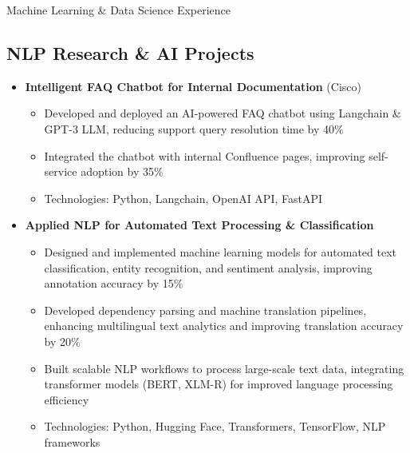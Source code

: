 \documentclass{resume} %
\begin{document}
\begin{rSection}{Machine Learning \& Data Science Experience}

    \subsection*{NLP Research \& AI Projects}
        \begin{itemize}
            \item \textbf{Intelligent FAQ Chatbot for Internal Documentation} (Cisco)
                \begin{itemize}
                    \item Developed and deployed an AI-powered FAQ chatbot using Langchain \& GPT-3 LLM, reducing support query resolution time by 40\%
                    \item Integrated the chatbot with internal Confluence pages, improving self-service adoption by 35\%
                    \item Technologies: Python, Langchain, OpenAI API, FastAPI
                \end{itemize}
            \item \textbf{Applied NLP for Automated Text Processing \& Classification}
                \begin{itemize}
                    \item Designed and implemented machine learning models for automated text classification, entity recognition, and sentiment analysis, improving annotation accuracy by 15\%
                    \item Developed dependency parsing and machine translation pipelines, enhancing multilingual text analytics and improving translation accuracy by 20\%
                    \item Built scalable NLP workflows to process large-scale text data, integrating transformer models (BERT, XLM-R) for improved language processing efficiency
                    \item Technologies: Python, Hugging Face, Transformers, TensorFlow, NLP frameworks
                \end{itemize}
        \end{itemize}


\end{rSection}
\end{document}
